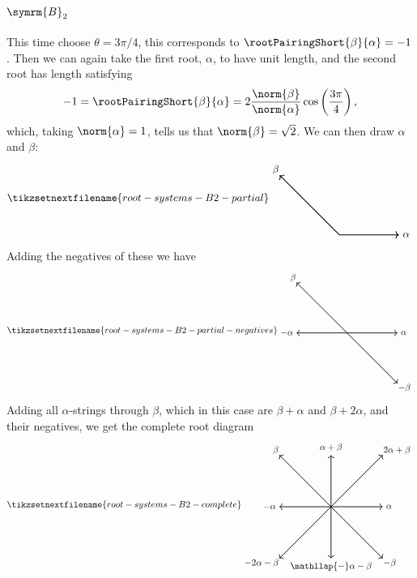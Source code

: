 \documentclass[fleqn]{NotesClass}
\newcommand{\dynkin}[2]{\symrm{#1}_{#2}}
\begin{document}
    \subsection{\texorpdfstring{\(\dynkin{B}{2}\)}{B2}}
    This time choose \(\theta = 3\pi/4\), this corresponds to \(\rootPairingShort{\beta}{\alpha} = -1\).
    Then we can again take the first root, \(\alpha\), to have unit length, and the second root has length satisfying
    \begin{equation}
        -1 = \rootPairingShort{\beta}{\alpha} = 2 \frac{\norm{\beta}}{\norm{\alpha}} \cos\left( \frac{3\pi}{4} \right),
    \end{equation}
    which, taking \(\norm{\alpha} = 1\), tells us that \(\norm{\beta} = \sqrt{2}\).
    We can then draw \(\alpha\) and \(\beta\):
    \begin{equation}
        \tikzsetnextfilename{root-systems-B2-partial}
        \begin{tikzpicture}[baseline=(current bounding box)]
            \draw[->, thick] (0, 0) -- (2, 0) node [right] {\(\alpha\)};
            \draw[->, thick] (0, 0) -- (135:{2*sqrt(2)}) node [above left, shift={(-45:0.15)}] {\(\beta\)};
        \end{tikzpicture}
    \end{equation}
    Adding the negatives of these we have
    \begin{equation}
        \tikzsetnextfilename{root-systems-B2-partial-negatives}
        \begin{tikzpicture}[baseline=(current bounding box)]
            \draw[->, thick] (0, 0) -- (2, 0) node [right] {\(\alpha\)};
            \draw[->, thick] (0, 0) -- (135:{2*sqrt(2)}) node [above left, shift={(-45:0.15)}] {\(\beta\)};
            \draw[->, thick] (0, 0) -- (-2, 0) node [left] {\(-\alpha\)};
            \draw[->, thick] (0, 0) -- (-45:{2*sqrt(2)}) node [below right, shift={(135:0.15)}] {\(-\beta\)};
        \end{tikzpicture}
    \end{equation}
    Adding all \(\alpha\)-strings through \(\beta\), which in this case are \(\beta + \alpha\) and \(\beta + 2\alpha\), and their negatives, we get the complete root diagram
    \begin{equation}
        \tikzsetnextfilename{root-systems-B2-complete}
        \begin{tikzpicture}[baseline=(current bounding box)]
            \draw[->, thick] (0, 0) -- (2, 0) node [right] {\(\alpha\)};
            \draw[->, thick] (0, 0) -- (135:{2*sqrt(2)}) node [above left, shift={(-45:0.15)}] {\(\beta\)};
            \draw[->, thick] (0, 0) -- (-2, 0) node [left] {\(-\alpha\)};
            \draw[->, thick] (0, 0) -- (-45:{2*sqrt(2)}) node [below right, shift={(135:0.15)}] {\(-\beta\)};
            \draw[->, thick] (0, 0) -- (45:{2*sqrt(2)}) node [above right, shift={(-135:0.15)}] {\(2\alpha + \beta\)};
            \draw[->, thick] (0, 0) -- (-135:{2*sqrt(2)}) node [below left, shift={(45:0.15)}] {\(-2\alpha - \beta\)};
            \draw[->, thick] (0, 0) -- (0, 2) node [above] {\(\alpha + \beta\)};
            \draw[->, thick] (0, 0) -- (0, -2) node [below] {\(\mathllap{-}\alpha - \beta\)};
        \end{tikzpicture}
    \end{equation}
\end{document}
